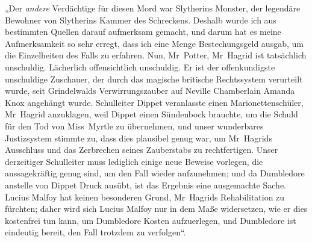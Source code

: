 „Der \emph{andere} Verdächtige für diesen Mord war Slytherins Monster, der legendäre Bewohner von Slytherins Kammer des Schreckens. Deshalb wurde ich aus bestimmten Quellen darauf aufmerksam gemacht, und darum hat es meine Aufmerksamkeit so sehr erregt, dass ich eine Menge Bestechungsgeld ausgab, um die Einzelheiten des Falls zu erfahren. Nun, Mr~Potter, Mr~Hagrid ist tatsächlich unschuldig. Lächerlich offensichtlich unschuldig. Er ist der offenkundigste unschuldige Zuschauer, der durch das magische britische Rechtssystem verurteilt wurde, seit Grindelwalds Verwirrungszauber auf Neville Chamberlain Amanda Knox angehängt wurde. Schulleiter Dippet veranlasste einen Marionettenschüler, Mr~Hagrid anzuklagen, weil Dippet einen Sündenbock brauchte, um die Schuld für den Tod von Miss~Myrtle zu übernehmen, und unser wunderbares Justizsystem stimmte zu, dass dies plausibel genug war, um Mr~Hagrids Ausschluss und das Zerbrechen seines Zauberstabs zu rechtfertigen. Unser derzeitiger Schulleiter muss lediglich einige neue Beweise vorlegen, die aussagekräftig genug sind, um den Fall wieder aufzunehmen; und da Dumbledore anstelle von Dippet Druck ausübt, ist das Ergebnis eine ausgemachte Sache. Lucius Malfoy hat keinen besonderen Grund, Mr~Hagrids Rehabilitation zu fürchten; daher wird sich Lucius Malfoy nur in dem Maße widersetzen, wie er dies kostenfrei tun kann, um Dumbledore Kosten aufzuerlegen, und Dumbledore ist eindeutig bereit, den Fall trotzdem zu verfolgen“.

